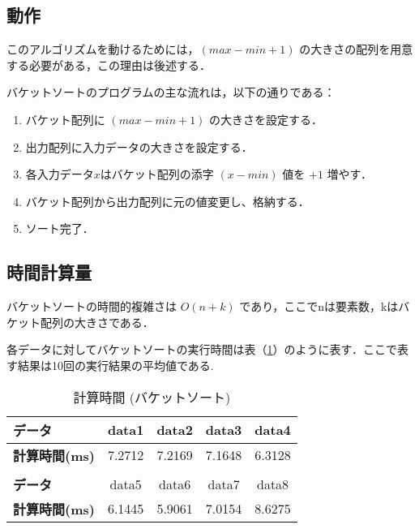 \documentclass[a4j, titlepage]{jarticle}
\begin{document}
        \subsection{動作}
            このアルゴリズムを動けるためには，$(max - min + 1)$ の大きさの配列を用意する必要がある，この理由は後述する．
            
            バケットソートのプログラムの主な流れは，以下の通りである：
            \begin{enumerate}
                \item バケット配列に $(max - min + 1)$ の大きさを設定する．
                \item 出力配列に入力データの大きさを設定する．
                \item 各入力データ$x$はバケット配列の添字 $(x - min)$ 値を $+1$ 増やす．
                \item バケット配列から出力配列に元の値変更し、格納する．
                \item ソート完了．
            \end{enumerate}

        \subsection{時間計算量}
            バケットソートの時間的複雑さは $O(n + k)$ であり，ここでnは要素数，kはバケット配列の大きさである．

            各データに対してバケットソートの実行時間は表（\ref{tab:bucket}）のように表す．ここで表す結果は10回の実行結果の平均値である.

            \begin{table}[tbh]
                \caption{計算時間 (バケットソート)}
                \label{tab:bucket}
                \begin{center}
                    \begin{tabular}{lcccc}
                        \hline
                        \textbf{データ} & data1 & data2 &data3 &data4\\ \hline
                        \textbf{計算時間(ms)} & 7.2712 & 7.2169 & 7.1648 & 6.3128 \\\hline
                        \\ \hline
                        \textbf{データ} &data5 &data6 &data7 &data8\\ \hline
                        \textbf{計算時間(ms)} & 6.1445 & 5.9061 & 7.0154 & 8.6275\\ \hline
                    \end{tabular}
                \end{center}
            \end{table}
\end{document}
